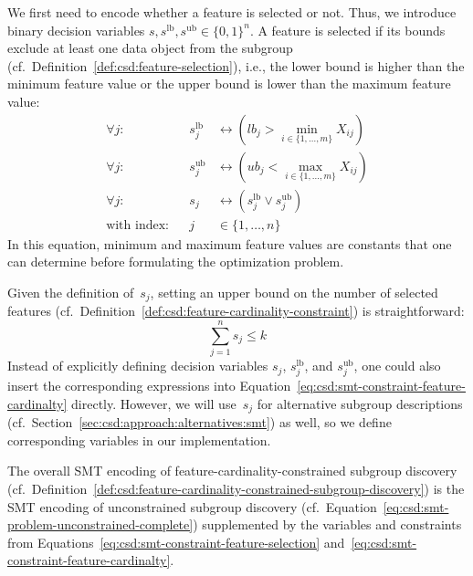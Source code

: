 \documentclass{article}
\theoremstyle{definition}
\begin{document}
We first need to encode whether a feature is selected or not.
Thus, we introduce binary decision variables $s, s^{\text{lb}}, s^{\text{ub}} \in \{0, 1\}^n$.
A feature is selected if its bounds exclude at least one data object from the subgroup (cf.~Definition~\ref{def:csd:feature-selection}), i.e., the lower bound is higher than the minimum feature value or the upper bound is lower than the maximum feature value:
%
\begin{equation}
	\begin{aligned}
		\forall j: & & s^{\text{lb}}_j &\leftrightarrow \left( \mathit{lb}_j > \min_{i \in \{1, \dots, m\}} X_{ij} \right) \\
		\forall j: & &s^{\text{ub}}_j &\leftrightarrow \left( \mathit{ub}_j < \max_{i \in \{1, \dots, m\}} X_{ij} \right) \\
		\forall j: & & s_j &\leftrightarrow \left( s^{\text{lb}}_j \lor s^{\text{ub}}_j \right) \\
		\text{with index:} & & j &\in \{1, \dots, n\}
	\end{aligned}
	\label{eq:csd:smt-constraint-feature-selection}
\end{equation}
%
In this equation, minimum and maximum feature values are constants that one can determine before formulating the optimization problem.

Given the definition of~$s_j$, setting an upper bound on the number of selected features (cf.~Definition~\ref{def:csd:feature-cardinality-constraint}) is straightforward:
%
\begin{equation}
	\sum_{j=1}^n s_j \leq k
	\label{eq:csd:smt-constraint-feature-cardinalty}
\end{equation}
%
Instead of explicitly defining decision variables $s_j$, $s^{\text{lb}}_j$, and $s^{\text{ub}}_j$, one could also insert the corresponding expressions into Equation~\ref{eq:csd:smt-constraint-feature-cardinalty} directly.
However, we will use~$s_j$ for alternative subgroup descriptions (cf.~Section~\ref{sec:csd:approach:alternatives:smt}) as well, so we define corresponding variables in our implementation.

The overall SMT encoding of feature-cardinality-constrained subgroup discovery (cf.~Definition~\ref{def:csd:feature-cardinality-constrained-subgroup-discovery}) is the SMT encoding of unconstrained subgroup discovery (cf.~Equation~\ref{eq:csd:smt-problem-unconstrained-complete}) supplemented by the variables and constraints from Equations~\ref{eq:csd:smt-constraint-feature-selection} and~\ref{eq:csd:smt-constraint-feature-cardinalty}.
\end{document}
